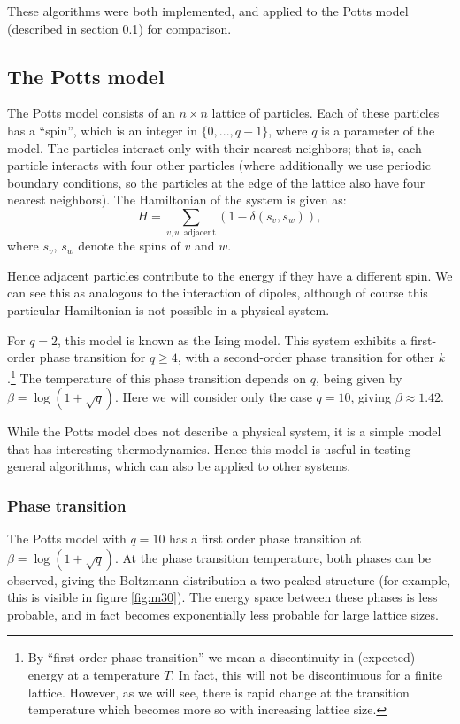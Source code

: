 \documentclass{article}
\begin{document}
These algorithms were both implemented, and applied to the Potts model (described in section \ref{sec:potts_model}) for comparison.

\subsection{The Potts model}
\label{sec:potts_model}
The Potts model consists of an $n\times n$ lattice of particles.
Each of these particles has a ``spin'', which is an integer in $\{0,...,q-1\}$, where $q$ is a parameter of the model.
The particles interact only with their nearest neighbors; that is, each particle interacts with four other particles (where additionally we use periodic boundary conditions, so the particles at the edge of the lattice also have four nearest neighbors).
The Hamiltonian of the system is given as:
$$ H = \sum_{v, w \text{ adjacent}}(1-\delta(s_v, s_w)), $$
where $s_v$, $s_w$ denote the spins of $v$ and $w$.

Hence adjacent particles contribute to the energy if they have a different spin.
We can see this as analogous to the interaction of dipoles, although of course this particular Hamiltonian is not possible in a physical system.

For $q = 2$, this model is known as the Ising model.
This system exhibits a first-order phase transition for $q \geq 4$, with a second-order phase transition for other $k$.\cite{Janke}\footnote{By ``first-order phase transition'' we mean a discontinuity in (expected) energy at a temperature $T$. In fact, this will not be discontinuous for a finite lattice. However, as we will see, there is rapid change at the transition temperature which becomes more so with increasing lattice size.}
The temperature of this phase transition depends on $q$, being given by $\beta = \log(1+\sqrt q)$.\cite{Janke}
Here we will consider only the case $q = 10$, giving $\beta \approx 1.42$.

While the Potts model does not describe a physical system, it is a simple model that has interesting thermodynamics.
Hence this model is useful in testing general algorithms, which can also be applied to other systems.

\subsubsection{Phase transition}
The Potts model with $q = 10$ has a first order phase transition at $\beta = \log(1+\sqrt q)$.\cite{Janke}
At the phase transition temperature, both phases can be observed, giving the Boltzmann distribution a two-peaked structure (for example, this is visible in figure \ref{fig:m30}).
The energy space between these phases is less probable, and in fact becomes exponentially less probable for large lattice sizes.\cite{WangLandau}
\end{document}
